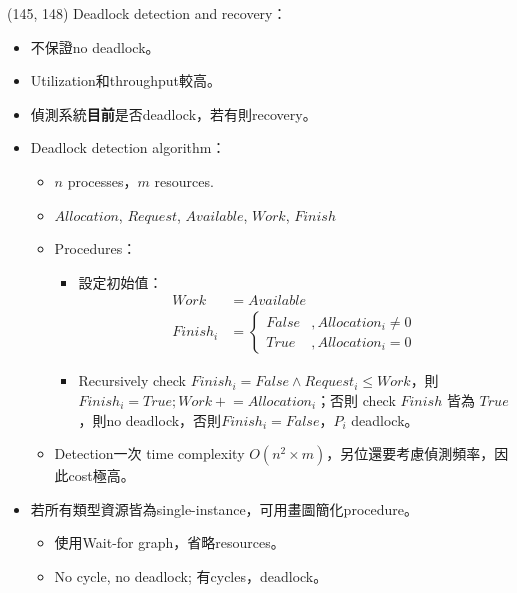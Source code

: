 \begin{theorem}{(145, 148)} Deadlock detection and recovery：\begin{itemize}
        \item 不保證no deadlock。
        \item Utilization和throughput較高。
        \item 偵測系統\textbf{目前}是否deadlock，若有則recovery。
        \item Deadlock detection algorithm：\begin{itemize}
            \item $n$ processes，$m$ resources. 
            \item $Allocation$, $Request$, $Available$, $Work$, $Finish$
            \item Procedures：\begin{itemize}
                \item 設定初始值：\begin{equation}
                    \begin{aligned}
                        Work & = Available \\
                        Finish_i & = \begin{cases}
                            False &, Allocation_i \neq 0 \\
                            True &, Allocation_i = 0
                        \end{cases}
                    \end{aligned}
                \end{equation}
                \item Recursively check $Finish_i = False \land Request_i \le Work$，則$Finish_i = True; Work \mathrel{+}= Allocation_i$；否則 check $Finish$ 皆為 $True$，則no deadlock，否則$Finish_i = False$，$P_i$ deadlock。
            \end{itemize}
            \item Detection一次 time complexity $O(n^2 \times m)$，另位還要考慮偵測頻率，因此cost極高。
        \end{itemize}
        \item 若所有類型資源皆為single-instance，可用畫圖簡化procedure。\begin{itemize}
            \item 使用Wait-for graph，省略resources。
            \item No cycle, no deadlock; 有cycles，deadlock。
        \end{itemize}

\end{itemize}
\end{theorem}
